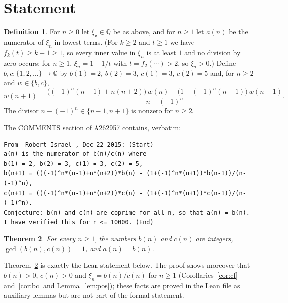 \documentclass[11pt]{amsart}
\theoremstyle{plain}
\newtheorem{theorem}{Theorem}
\theoremstyle{definition}
\newtheorem{definition}[theorem]{Definition}
\newcommand{\Q}{\mathbb{Q}}
\begin{document}
\section{Statement}\label{sec:statement}

\begin{definition}\label{def:main}
For $n\ge0$ let $\xi_n\in\Q$ be as above, and for $n\ge1$ let $a(n)$ be the numerator of $\xi_n$ in lowest terms.
(For $k\ge2$ and $t\ge1$ we have $f_k(t)\ge k-1\ge1$, so every inner value in $\xi_n$ is at least $1$ and no division by zero occurs; for $n\ge1$, $\xi_n=1-1/t$ with $t=f_2(\cdots)>2$, so $\xi_n>0$.)
Define $b,c\colon\{1,2,\dots\}\to\Q$ by $b(1)=2$, $b(2)=3$, $c(1)=3$, $c(2)=5$ and, for $n\ge2$ and $w\in\{b,c\}$,
\begin{equation}\label{eq:israel}
  w(n+1)=\frac{\bigl((-1)^n(n-1)+n(n+2)\bigr)\,w(n)-\bigl(1+(-1)^n(n+1)\bigr)\,w(n-1)}{n-(-1)^n}.
\end{equation}
The divisor $n-(-1)^n\in\{n-1,n+1\}$ is nonzero for $n\ge2$.
\end{definition}

The COMMENTS section of A262957 \cite{A262957} contains, verbatim:
\begin{lstlisting}[keywords={},frame=none,basicstyle=\ttfamily\footnotesize]
From _Robert Israel_, Dec 22 2015: (Start)
a(n) is the numerator of b(n)/c(n) where
b(1) = 2, b(2) = 3, c(1) = 3, c(2) = 5,
b(n+1) = (((-1)^n*(n-1)+n*(n+2))*b(n) - (1+(-1)^n*(n+1))*b(n-1))/(n-(-1)^n),
c(n+1) = (((-1)^n*(n-1)+n*(n+2))*c(n) - (1+(-1)^n*(n+1))*c(n-1))/(n-(-1)^n).
Conjecture: b(n) and c(n) are coprime for all n, so that a(n) = b(n).
I have verified this for n <= 10000. (End)
\end{lstlisting}

\begin{theorem}\label{thm:main}
For every $n\ge1$, the numbers $b(n)$ and $c(n)$ are integers, $\gcd(b(n),c(n))=1$, and $a(n)=b(n)$.
\end{theorem}

Theorem~\ref{thm:main} is exactly the Lean statement below. The proof shows moreover that $b(n)>0$, $c(n)>0$ and $\xi_n=b(n)/c(n)$ for $n\ge1$ (Corollaries~\ref{cor:cf} and~\ref{cor:bc} and Lemma~\ref{lem:pos}); these facts are proved in the Lean file as auxiliary lemmas but are not part of the formal statement.
\end{document}
